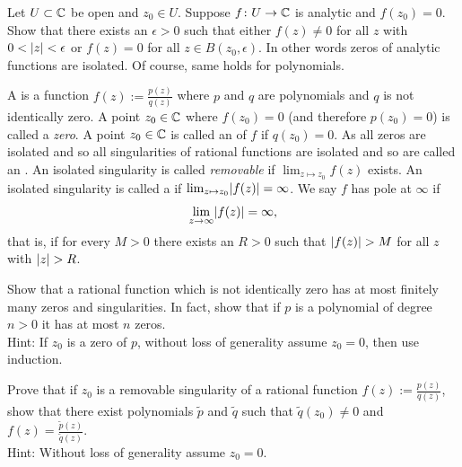 \begin{exercise}
Let $U \subset {\mathbb{C}}$ be open and $z_0 \in U$.
Suppose $f \colon U \to {\mathbb{C}}$ is analytic and $f(z_0) = 0$.  Show that
there exists an $\epsilon > 0$ such that either
$f(z) \not= 0$ for all $z$ with $0 < \lvert {z} \rvert < \epsilon$
or $f(z) = 0$ for all $z \in B(z_0,\epsilon)$.
In other words zeros of analytic functions are isolated.
Of course, same holds for polynomials.
\end{exercise}

\begin{exnote}
A \emph{} is a function
$f(z) := \frac{p(z)}{q(z)}$
where $p$ and $q$ are polynomials and $q$ is not identically zero.
A point $z_0 \in {\mathbb{C}}$ where $f(z_0) = 0$ (and therefore $p(z_0) = 0$)
is called a \emph{zero}.
A point $z_0 \in {\mathbb{C}}$ is called an \emph{} of
$f$ if $q(z_0) = 0$.  As all zeros are isolated and so
all singularities of rational functions are isolated
and so are called
an \emph{}.
An isolated singularity is called
\emph{removable}
if $\lim_{z \mapsto z_0} f(z)$ exists.
An isolated singularity is called a \emph{} if 
$\lim_{z \mapsto z_0} \lvert {f(z)} \rvert = \infty$.
We say $f$ has pole at $\infty$ if
\begin{equation*}
\lim_{z \to \infty} \lvert {f(z)} \rvert = \infty ,
\end{equation*}
that is, if for every $M > 0$ there exists an $R > 0$ such that
$\lvert {f(z)} \rvert > M$ for all $z$ with $\lvert {z} \rvert > R$.
\end{exnote}

\begin{exercise}
Show that a rational function which is not identically
zero has at most finitely many zeros and
singularities.  In fact, show that if $p$ is a polynomial of 
degree $n > 0$ it has at most $n$ zeros.
\\
Hint: If $z_0$ is a zero of $p$, without loss of generality assume $z_0 =
0$, then use induction.
\end{exercise}

\begin{exercise}
Prove that if $z_0$ is a removable singularity of a rational
function $f(z) := \frac{p(z)}{q(z)}$, show that there exist
polynomials $\widetilde{p}$ and $\widetilde{q}$ such that
$\widetilde{q}(z_0) \not= 0$ and $f(z) =
\frac{\widetilde{p}(z)}{\widetilde{q}(z)}$.
\\
Hint: Without loss of generality assume $z_0 = 0$.
\end{exercise}

